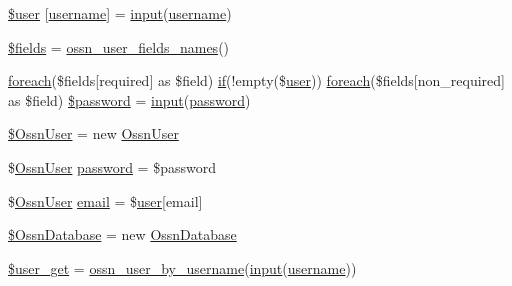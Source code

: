 \begin{DoxyCompactItemize}
\item 
\hyperlink{components_2_ossn_profile_2actions_2edit_8php_a48c184d1487bdbc0b0d2fe6e1521dd7d}{\$user} \mbox{[}\textquotesingle{}\hyperlink{actions_2account_8php_ac9b3768ccc688c2ff0811c50c107a02e}{username}\textquotesingle{}\mbox{]} = \hyperlink{ossn_8lib_8input_8php_a64ebee98b041c4f75f71ed3cd73cc8ed}{input}(\textquotesingle{}\hyperlink{actions_2account_8php_ac9b3768ccc688c2ff0811c50c107a02e}{username}\textquotesingle{})
\item 
\hyperlink{components_2_ossn_profile_2actions_2edit_8php_ab2303c817e3b402b77b7f99627b9c319}{\$fields} = \hyperlink{ossn_8lib_8users_8php_a67125cfdd672959bff2d8dbd44034cb0}{ossn\+\_\+user\+\_\+fields\+\_\+names}()
\item 
\hyperlink{user__timeline_8php_a1b18c909b5f0affc85267f294d947c4b}{foreach}(\$fields\mbox{[}\textquotesingle{}required\textquotesingle{}\mbox{]} as \$field) \hyperlink{jquery_8tokeninput_8js_ad8dd46a3cbc004569e34401e9e71771a}{if}(!empty(\$\hyperlink{ossn_8config_8db_8example_8php_a802544b7ba9f79bbf24ef67773d53bed}{user})) \hyperlink{user__timeline_8php_a1b18c909b5f0affc85267f294d947c4b}{foreach}(\$fields\mbox{[}\textquotesingle{}non\+\_\+required\textquotesingle{}\mbox{]} as \$field) \hyperlink{components_2_ossn_profile_2actions_2edit_8php_aebf9449c5c541e2675a1d40a3bc19eda}{\$password} = \hyperlink{ossn_8lib_8input_8php_a64ebee98b041c4f75f71ed3cd73cc8ed}{input}(\textquotesingle{}\hyperlink{actions_2account_8php_a3ef39d3ee8b2bcca6a288308549ccb44}{password}\textquotesingle{})
\item 
\hyperlink{components_2_ossn_profile_2actions_2edit_8php_a51d9a97b3f5090e1d74fb31d06de0938}{\$\+Ossn\+User} = new \hyperlink{class_ossn_user}{Ossn\+User}
\item 
\$\hyperlink{class_ossn_user}{Ossn\+User} \hyperlink{components_2_ossn_profile_2actions_2edit_8php_abec14e65dc912d61d2d443eb3533cd9f}{password} = \$password
\item 
\$\hyperlink{class_ossn_user}{Ossn\+User} \hyperlink{components_2_ossn_profile_2actions_2edit_8php_a029df90d1a93ec9889cd9e166863617c}{email} = \$\hyperlink{ossn_8config_8db_8example_8php_a802544b7ba9f79bbf24ef67773d53bed}{user}\mbox{[}\textquotesingle{}email\textquotesingle{}\mbox{]}
\item 
\hyperlink{components_2_ossn_profile_2actions_2edit_8php_a8579dda900a1e2336bb710006263bc02}{\$\+Ossn\+Database} = new \hyperlink{class_ossn_database}{Ossn\+Database}
\item 
\hyperlink{components_2_ossn_profile_2actions_2edit_8php_a6851f6679565e5c254fb5b72c5ffe917}{\$user\+\_\+get} = \hyperlink{ossn_8lib_8users_8php_a77fdcb678aedd165af1f9f875645c864}{ossn\+\_\+user\+\_\+by\+\_\+username}(\hyperlink{ossn_8lib_8input_8php_a64ebee98b041c4f75f71ed3cd73cc8ed}{input}(\textquotesingle{}\hyperlink{actions_2account_8php_ac9b3768ccc688c2ff0811c50c107a02e}{username}\textquotesingle{}))

\end{DoxyCompactItemize}
